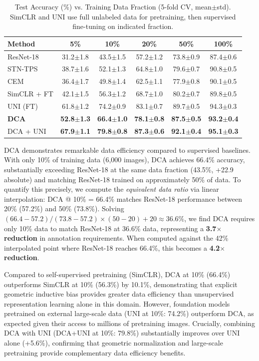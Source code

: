 \documentclass[10pt,journal,compsoc]{IEEEtran}
\begin{document}
\begin{table}[t]
\centering
\caption{Test Accuracy (\%) vs. Training Data Fraction (5-fold CV, mean$\pm$std). SimCLR and UNI use full unlabeled data for pretraining, then supervised fine-tuning on indicated fraction.}
\label{tab:data_efficiency}
\setlength{\tabcolsep}{2.5pt}
\begin{tabular}{lccccc}
\hline
\textbf{Method} & \textbf{5\%} & \textbf{10\%} & \textbf{20\%} & \textbf{50\%} & \textbf{100\%} \\
\hline
ResNet-18 & 31.2$\pm$1.8 & 43.5$\pm$1.5 & 57.2$\pm$1.2 & 73.8$\pm$0.9 & 87.4$\pm$0.6 \\
STN-TPS & 38.7$\pm$1.6 & 52.1$\pm$1.3 & 64.8$\pm$1.0 & 79.6$\pm$0.7 & 90.8$\pm$0.5 \\
CEM & 36.4$\pm$1.7 & 49.8$\pm$1.4 & 62.5$\pm$1.1 & 77.9$\pm$0.8 & 90.1$\pm$0.5 \\
SimCLR + FT & 42.1$\pm$1.5 & 56.3$\pm$1.2 & 68.7$\pm$1.0 & 80.2$\pm$0.7 & 89.8$\pm$0.5 \\
UNI (FT) & 61.8$\pm$1.2 & 74.2$\pm$0.9 & 83.1$\pm$0.7 & 89.7$\pm$0.5 & 94.3$\pm$0.3 \\
\textbf{DCA} & \textbf{52.8$\pm$1.3} & \textbf{66.4$\pm$1.0} & \textbf{78.1$\pm$0.8} & \textbf{87.5$\pm$0.5} & \textbf{93.2$\pm$0.4} \\
DCA + UNI & \textbf{67.9$\pm$1.1} & \textbf{79.8$\pm$0.8} & \textbf{87.3$\pm$0.6} & \textbf{92.1$\pm$0.4} & \textbf{95.1$\pm$0.3} \\
\hline
\end{tabular}
\end{table}

DCA demonstrates remarkable data efficiency compared to supervised baselines. With only 10\% of training data (6,000 images), DCA achieves 66.4\% accuracy, substantially exceeding ResNet-18 at the same data fraction (43.5\%, +22.9 absolute) and matching ResNet-18 trained on approximately 50\% of data. To quantify this precisely, we compute the \textit{equivalent data ratio} via linear interpolation: DCA @ 10\% = 66.4\% matches ResNet-18 performance between 20\% (57.2\%) and 50\% (73.8\%). Solving $(66.4 - 57.2)/(73.8 - 57.2) \times (50 - 20) + 20 \approx 36.6\%$, we find DCA requires only 10\% data to match ResNet-18 at 36.6\% data, representing a \textbf{3.7$\times$ reduction} in annotation requirements. When computed against the 42\% interpolated point where ResNet-18 reaches 66.4\%, this becomes a \textbf{4.2$\times$ reduction}.

Compared to self-supervised pretraining (SimCLR), DCA at 10\% (66.4\%) outperforms SimCLR at 10\% (56.3\%) by 10.1\%, demonstrating that explicit geometric inductive bias provides greater data efficiency than unsupervised representation learning alone in this domain. However, foundation models pretrained on external large-scale data (UNI at 10\%: 74.2\%) outperform DCA, as expected given their access to millions of pretraining images. Crucially, combining DCA with UNI (DCA+UNI at 10\%: 79.8\%) substantially improves over UNI alone (+5.6\%), confirming that geometric normalization and large-scale pretraining provide complementary data efficiency benefits.
\end{document}
